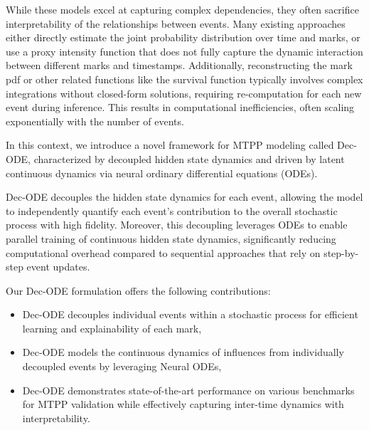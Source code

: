 While these models excel at capturing complex dependencies, they often sacrifice interpretability of the relationships between events. 
Many existing approaches either directly estimate the joint probability distribution over time and marks, or use a proxy intensity function that does not fully capture the dynamic interaction between different marks and timestamps. 
Additionally, reconstructing the mark pdf or other related functions like the survival function typically involves complex integrations without closed-form solutions, requiring re-computation for each new event during inference. This results in computational inefficiencies, often scaling exponentially with the number of events.

In this context, we introduce a novel framework for MTPP modeling called Dec-ODE, characterized by decoupled hidden state dynamics and driven by latent continuous dynamics via neural ordinary differential equations (ODEs). 

Dec-ODE decouples the hidden state dynamics for each event, allowing the model to independently quantify each event’s contribution to the overall stochastic process with high fidelity. 
Moreover, this decoupling leverages ODEs to enable parallel training of continuous hidden state dynamics, significantly reducing computational overhead compared to sequential approaches that rely on step-by-step event updates.

Our Dec-ODE formulation offers the following contributions:
\begin{itemize}
    \item Dec-ODE decouples individual events within a stochastic process for efficient learning and explainability of each mark, 
    \item Dec-ODE models the continuous dynamics of influences from individually decoupled events by leveraging Neural ODEs,
    \item Dec-ODE demonstrates state-of-the-art performance on various benchmarks for MTPP validation while effectively capturing inter-time dynamics with interpretability. 
\end{itemize} 
